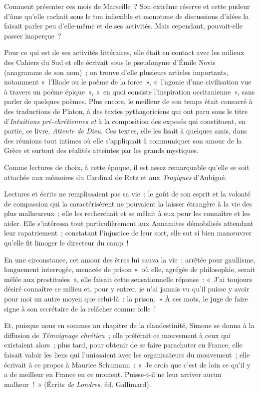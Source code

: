 \documentclass[french,twoside]{book} %
\begin{document}
Comment présenter ces mois de Marseille ? Son extrême réserve et cette pudeur d'âme qu'elle cachait sous le ton inflexible et monotone de discussions d'idées la faisait parler peu d'elle-même et de ses activités. Mais cependant, pouvait-elle passer inaperçue ?\par
Pour ce qui est de ses activités littéraires, elle était en contact avec les milieux des Cahiers du Sud et elle écrivait sous le pseudonyme d'Émile Novis (anagramme de son nom) ; on trouve d'elle plusieurs articles importants, notamment « l'Iliade ou le poème de la force », « l'agonie d'une civilisation vue à travers un poème épique », « en quoi consiste l'inspiration occitanienne », sans parler de quelques poèmes. Plus encore, le meilleur de son temps était consacré à des traductions de Platon, à des textes pythagoriciens qui ont paru sous le titre d'{\itshape Intuitions pré-chrétiennes et} à la composition des exposés qui constituent, en partie, ce livre, {\itshape Attente de Dieu.} Ces textes, elle les lisait à quelques amis, dans des réunions tout intimes où elle s'appliquait à communiquer son amour de la Grèce et surtout des réalités atteintes par les grands mystiques.\par
Comme lectures de choix, à cette époque, il est assez remarquable qu'elle se soit attachée aux mémoires du Cardinal de Retz et aux {\itshape Tragiques} d'Aubigné.\par
Lectures et écrits ne remplissaient pas sa vie ; le goût de son esprit et la volonté de compassion qui la caractérisèrent ne pouvaient la laisser étrangère à la vie des plus malheureux ; elle les recherchait et se mêlait à eux pour les connaître et les aider. Elle s'intéressa tout particulièrement aux Annamites démobilisés attendant leur rapatriement ; constatant l'injustice de leur sort, elle sut si bien manœuvrer qu'elle fit limoger le directeur du camp !\par
En une circonstance, cet amour des êtres lui sauva la vie : arrêtée pour gaullisme, longuement interrogée, menacée de prison « où elle, agrégée de philosophie, serait mêlée aux prostituées », elle faisait cette sensationnelle réponse : « J'ai toujours désiré connaître ce milieu et, pour y entrer, je n'ai jamais vu qu'il puisse y avoir pour moi un autre moyen que celui-là : la prison. » À ces mots, le juge de faire signe à son secrétaire de la relâcher comme folle !\par
Et, puisque nous en sommes au chapitre de la clandestinité, Simone se donna à la diffusion de {\itshape Témoignage chrétien ;} elle préférait ce mouvement à ceux qui existaient alors ; plus tard, pour obtenir de se faire parachuter en France, elle faisait valoir les liens qui l'unissaient avec les organisateurs du mouvement ; elle écrivait à ce propos à Maurice Schumann : « Je crois que c'est de loin ce qu'il y a de meilleur en France en ce moment. Puisse-t-il ne leur arriver aucun malheur ! » (Écrits {\itshape de Londres}, éd. Gallimard).\par
\end{document}
